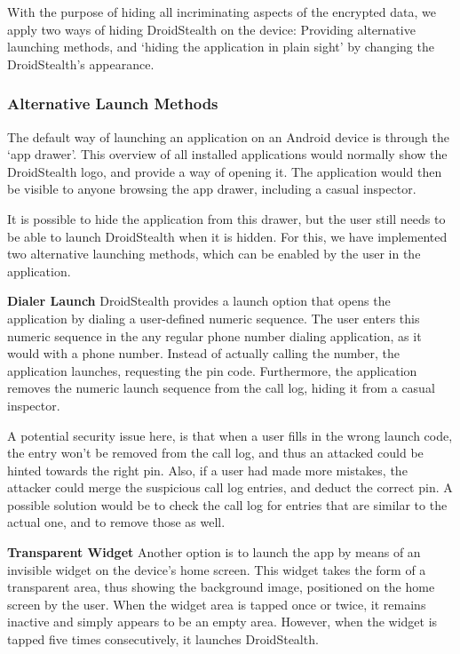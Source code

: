 With the purpose of hiding all incriminating aspects of the encrypted data, we apply two ways of hiding DroidStealth on the device: 
Providing alternative launching methods, and `hiding the application in plain sight' by changing the DroidStealth's appearance.

\subsubsection{Alternative Launch Methods}
The default way of launching an application on an Android device is through the `app drawer'.
This overview of all installed applications would normally show the DroidStealth logo, and provide a way of opening it.
The application would then be visible to anyone browsing the app drawer, including a casual inspector.

It is possible to hide the application from this drawer, but the user still needs to be able to launch DroidStealth when it is hidden.
For this, we have implemented two alternative launching methods, which can be enabled by the user in the application.

\textbf{Dialer Launch}
DroidStealth provides a launch option that opens the application by dialing a user-defined numeric sequence. 
The user enters this numeric sequence in the any regular phone number dialing application, as it would with a phone number.
Instead of actually calling the number, the application launches, requesting the pin code. 
Furthermore, the application removes the numeric launch sequence from the call log, hiding it from a casual inspector.

A potential security issue here, is that when a user fills in the wrong launch code, the entry won't be removed from the call log, and thus an attacked could be hinted towards the right pin. 
Also, if a user had made more mistakes, the attacker could merge the suspicious call log entries, and deduct the correct pin. 
A possible solution would be to check the call log for entries that are similar to the actual one, and to remove those as well.

\textbf{Transparent Widget}
Another option is to launch the app by means of an invisible widget on the device's home screen. 
This widget takes the form of a transparent area, thus showing the background image, positioned on the home screen by the user.
When the widget area is tapped once or twice, it remains inactive and simply appears to be an empty area.
However, when the widget is tapped five times consecutively, it launches DroidStealth.

